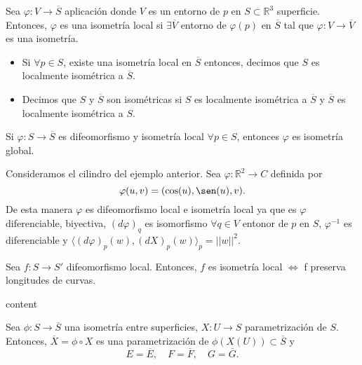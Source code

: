 \begin{defn}
  Sea $\varphi : V \to \overline{S}$ aplicación donde $V$ es un entorno de $p$ en $S \subset \mathbb{R}^{3}$ superficie. Entonces, $\varphi$ es una isometría local si $\exists \overline{V}$ entorno de $\varphi(p)$ en $\overline{S}$ tal que $\varphi : V \to \overline{V}$ es una isometría.

  \begin{itemize}
    \item Si $\forall p \in S$, existe una isometría local en $\overline{S}$ entonces, decimos que $S$ es localmente isométrica a $\overline{S}$.
    \item Decimos que $S$ y $\overline{S}$ son isométricas si $S$ es localmente isométrica a $\overline{S}$ y $\overline{S}$ es localmente isométrica a $S$.
  \end{itemize}
\end{defn}

\begin{obs}
  Si $\varphi : S \to \overline{S}$ es difeomorfismo y isometría local $\forall p \in S$, entonces $\varphi$ es isometría global.
\end{obs}

\begin{ejm}
  Consideramos el cilindro del ejemplo anterior. Sea $\varphi : \mathbb{R}^{2} \to C$ definida por
  \[ 
    \varphi(u, v) = (\cos(u), \sen(u), v).
  \] 
  De esta manera  $\varphi$ es difeomorfismo local e isometría local ya que es $\varphi$ diferenciable, biyectiva, $(d \varphi)_{q}$ es isomorfismo $\forall q \in V$ entonor de $p$ en $S$, $\varphi^{-1}$ es diferenciable y $\langle (d \varphi)_{p}(w){ , }(d X)_{p}(w) \rangle_{p} = ||w||^{2}$.
\end{ejm}

\begin{prop} 
  Sea $f : S \to S'$ difeomorfismo local. Entonces, $ f$ es isometría local $\Leftrightarrow$ f preserva longitudes de curvas.
\end{prop}

\begin{dem}
  content
\end{dem}

\begin{prop}
  Sea $\phi : S \to \overline{S}$ una isometría entre superficies, $X : U \to S$ parametrización de $S$. Entonces, $\overline{X} = \phi \circ X$ es una parametrización de $\phi(X(U)) \subset \overline{S}$ y
  \[ 
    E = \overline{E}, \quad F = \overline{F}, \quad G = \overline{G}. 
  \] 
\end{prop}

